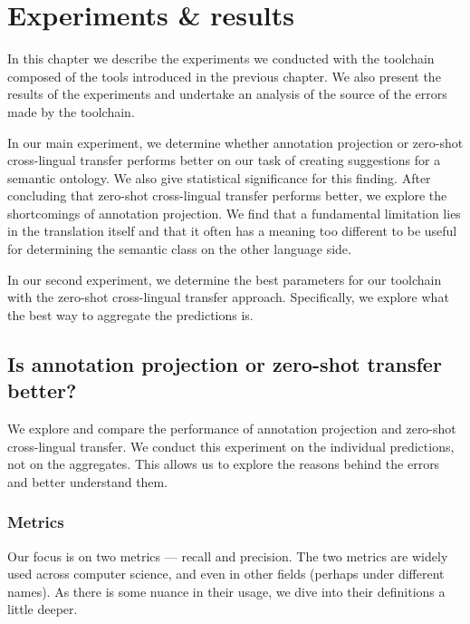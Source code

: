 \chapter{Experiments \& results}

In this chapter we describe the experiments we conducted with the toolchain composed of the tools introduced in the previous chapter. We also present the results of the experiments and undertake an analysis of the source of the errors made by the toolchain.

In our main experiment, we determine whether annotation projection or zero-shot cross-lingual transfer performs better on our task of creating suggestions for a semantic ontology. We also give statistical significance for this finding. After concluding that zero-shot cross-lingual transfer performs better, we explore the shortcomings of annotation projection. We find that a fundamental limitation lies in the translation itself and that it often has a meaning too different to be useful for determining the semantic class on the other language side.

In our second experiment, we determine the best parameters for our toolchain with the zero-shot cross-lingual transfer approach. Specifically, we explore what the best way to aggregate the predictions is. 

\section{Is annotation projection or zero-shot transfer better?}
\label{sec:exp1}

We explore and compare the performance of annotation projection and zero-shot cross-lingual transfer. We conduct this experiment on the individual predictions, not on the aggregates. This allows us to explore the reasons behind the errors and better understand them.

\subsection{Metrics}
\label{subsec:metrics}
Our focus is on two metrics --- recall and precision. The two metrics are widely used across computer science, and even in other fields (perhaps under different names). As there is some nuance in their usage, we dive into their definitions a little deeper.

